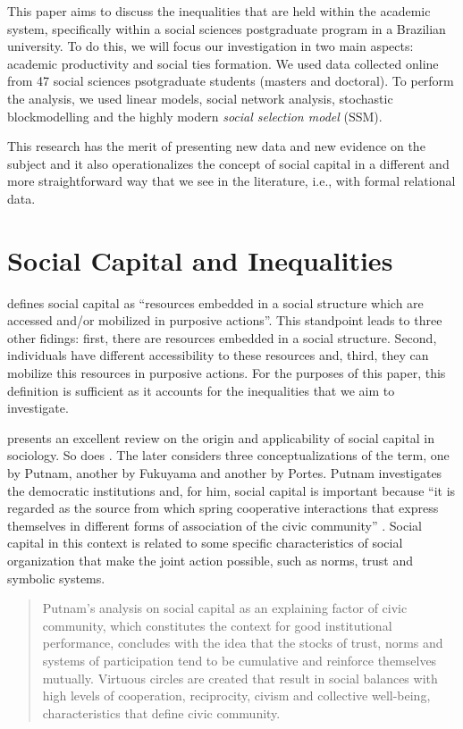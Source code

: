 \documentclass[12pt, english]{article}
\begin{document}
This paper aims to discuss the inequalities that are held within the academic system, specifically within a social sciences postgraduate program in a Brazilian university. To do this, we will focus our investigation in two main aspects: academic productivity and social ties formation. We used data collected online from 47 social sciences psotgraduate students (masters and doctoral). To perform the analysis, we used linear models, social network analysis, stochastic blockmodelling and the highly modern \textit{social selection model} (SSM).

This research has the merit of presenting new data and new evidence on the subject and it also operationalizes the concept of social capital in a different and more straightforward way that we see in the literature, i.e., with formal relational data.

\section{Social Capital and Inequalities}

\cite[p. 35]{lin1999building} defines social capital as ``resources embedded in a social structure which are accessed and/or mobilized in purposive actions''. This standpoint leads to three other fidings: first, there are resources embedded in a social structure. Second, individuals have different accessibility to these resources and, third, they can mobilize this resources in purposive actions. For the purposes of this paper, this definition is sufficient as it accounts for the inequalities that we aim to investigate.

\cite{portes1998social} presents an excellent review on the origin and applicability of social capital in sociology. So does \cite{higgins2005fundamentos}. The later considers three conceptualizations of the term, one by Putnam, another by Fukuyama and another by Portes. Putnam investigates the democratic institutions and, for him, social capital is important because ``it is regarded as the source from which spring cooperative interactions that express themselves in different forms of association of the civic community'' \cite[p. 63]{higgins2005fundamentos}. Social capital in this context is related to some specific characteristics of social organization that make the joint action possible, such as norms, trust and symbolic systems.



\begin{quotation}
	Putnam's analysis on social capital as an explaining factor of civic community, which constitutes the context for good institutional performance, concludes with the idea that the stocks of trust, norms and systems of participation tend to be cumulative and reinforce themselves mutually. Virtuous circles are created that result in social balances with high levels of cooperation, reciprocity, civism and collective well-being, characteristics that define civic community. \cite[p. 67]{higgins2005fundamentos}
\end{quotation}
\end{document}
